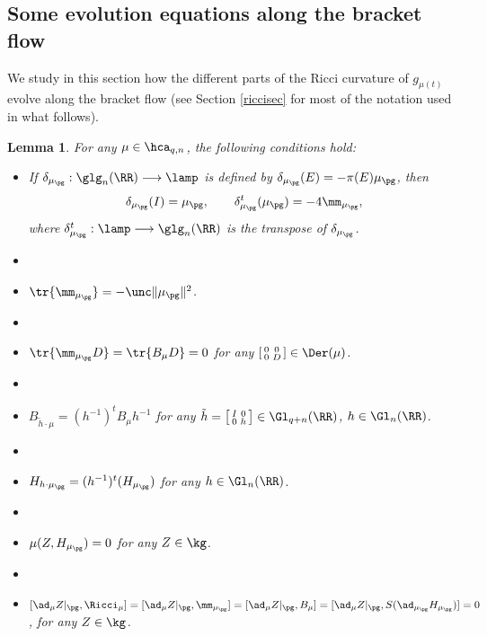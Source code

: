 \documentclass[11pt]{amsart}
\theoremstyle{plain}
\newtheorem{lemma}[theorem]{Lemma}
\theoremstyle{definition}
\theoremstyle{remark}
\begin{document}
\subsection{Some evolution equations along the bracket flow}
We study in this section how the different parts of the Ricci curvature of $g_{\mu(t)}$ evolve along the bracket flow (see Section \ref{riccisec} for most of the notation used in what follows).

\begin{lemma}\label{prop}
For any $\mu\in\hca_{q,n}$, the following conditions hold:
\begin{itemize}
\item[(i)] If $\delta_{\mu_{\pg}}:\glg_n(\RR)\longrightarrow\lamp$ is defined by $\delta_{\mu_{\pg}}(E)=-\pi(E)\mu_{\pg}$, then
$$
\delta_{\mu_{\pg}}(I)=\mu_{\pg}, \qquad \delta_{\mu_{\pg}}^t(\mu_{\pg})=-4\mm_{\mu_{\pg}},
$$
where $\delta_{\mu_{\pg}}^t:\lamp\longrightarrow\glg_n(\RR)$ is the transpose of $\delta_{\mu_{\pg}}$.
\item[ ]
\item[(ii)] $\tr{\mm_{\mu_{\pg}}}=-\unc\|\mu_{\pg}\|^2$.
\item[ ]

\item[(iii)] $\tr{\mm_{\mu_{\pg}}D}=\tr{B_{\mu}D}=0$ for any $\left[\begin{smallmatrix} 0&0\\ 0&D
\end{smallmatrix}\right]\in\Der(\mu)$.
\item[ ]

\item[(iv)] $B_{\tilde{h}\cdot\mu}=(h^{-1})^tB_{\mu}h^{-1}$ for any $\tilde{h}=\left[\begin{smallmatrix} I&0\\ 0&h
\end{smallmatrix}\right]\in\Gl_{q+n}(\RR)$, $h\in\Gl_n(\RR)$.
\item[ ]

\item[(v)] $H_{h\cdot\mu_{\pg}}=(h^{-1})^t(H_{\mu_{\pg}})$ for any $h\in\Gl_n(\RR)$.
\item[ ]

\item[(vi)] $\mu(Z,H_{\mu_{\pg}})=0$ for any $Z\in\kg$.
\item[ ]

\item[(vii)] $[\ad_{\mu}{Z}|_{\pg},\Ricci_\mu]=[\ad_{\mu}{Z}|_{\pg},\mm_{\mu_{\pg}}]=[\ad_{\mu}{Z}|_{\pg}, B_{\mu}]=[\ad_{\mu}{Z}|_{\pg},S(\ad_{\mu_{\pg}}{H_{\mu_{\pg}}})]=0$, for any $Z\in\kg$.
\end{itemize}
\end{lemma}
\end{document}
